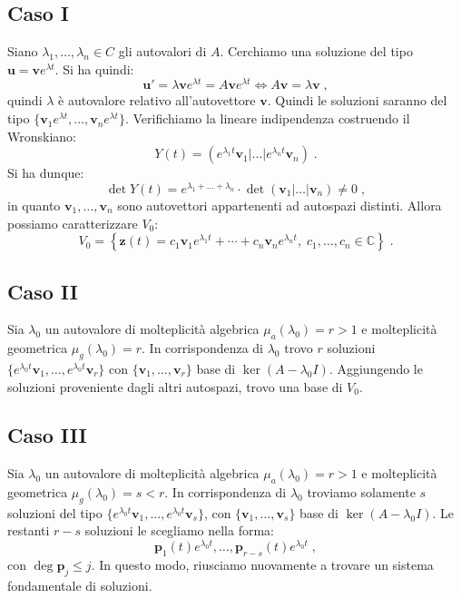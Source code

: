 \documentclass[a4paper,12pt]{report}
\theoremstyle{plain}
\theoremstyle{definition}
\theoremstyle{remark}
\numberwithin{equation}{section}
\begin{document}
\subsection{Caso I}
Siano $\lambda_1,\ldots,\lambda_n \in C$ gli autovalori di $A$. Cerchiamo una soluzione del tipo $\mathbf{u}=\mathbf{v}e^{\lambda t}$. Si ha 
quindi:
\begin{equation}
\mathbf{u}'=\lambda \mathbf{v} e^{\lambda t}= A \mathbf{v} e^{\lambda t} \Longleftrightarrow A\mathbf{v}=\lambda \mathbf{v}\;,
\end{equation}
quindi $\lambda$ è autovalore relativo all'autovettore $\mathbf{v}$. Quindi le soluzioni saranno del tipo $\{\mathbf{v}_1e^{\lambda t},
\ldots,\mathbf{v}_ne^{\lambda t}\}$. Verifichiamo la lineare indipendenza costruendo il Wronskiano:
\begin{equation}
Y(t)=(e^{\lambda_1 t}\mathbf{v}_1|\ldots|e^{\lambda_n t}\mathbf{v}_n)\;.
\end{equation}
Si ha dunque:
\begin{equation}
\det Y(t)=e^{\lambda_1+\ldots+\lambda_n}\cdot \det (\mathbf{v}_1|\ldots|\mathbf{v}_n) \ne 0\;,
\end{equation}
in quanto $\mathbf{v}_1,\ldots,\mathbf{v}_n$ sono autovettori appartenenti ad autospazi distinti. Allora possiamo caratterizzare $V_0$:
\begin{equation}
V_0=\left\{ \mathbf{z}(t)=c_1\mathbf{v}_1e^{\lambda_1 t}+\cdots+c_n\mathbf{v}_ne^{\lambda_n t},\;c_1,\ldots,c_n \in \mathbb{C}\right\}\;.
\end{equation}
\subsection{Caso II}
Sia $\lambda_0$ un autovalore di molteplicità algebrica $\mu_a (\lambda_0)=r>1$ e molteplicità geometrica $\mu_g (\lambda_0)=r$. In 
corrispondenza di $\lambda_0$ trovo $r$ soluzioni $\{e^{\lambda_0 t}\mathbf{v}_1,\ldots,e^{\lambda_0 t}\mathbf{v}_r\}$ con 
$\{\mathbf{v}_1,\ldots,\mathbf{v}_r\}$ base di $\ker(A-\lambda_0 I)$. Aggiungendo le soluzioni proveniente dagli altri autospazi, trovo 
una base di $V_0$.
\subsection{Caso III}
Sia $\lambda_0$ un autovalore di molteplicità algebrica $\mu_a (\lambda_0)=r>1$ e molteplicità geometrica $\mu_g (\lambda_0)=s<r$. In 
corrispondenza di $\lambda_0$ troviamo solamente $s$ soluzioni del tipo $\{e^{\lambda_0 t}\mathbf{v}_1,\ldots,e^{\lambda_0 t}\mathbf{v}_s\}$, con $\{\mathbf{v}_1,\ldots,\mathbf{v}_s\}$ base di $\ker(A-\lambda_0 I)$. Le restanti $r-s$ soluzioni le scegliamo nella forma:
\begin{equation}
\mathbf{p}_1(t)e^{\lambda_0 t},\ldots,\mathbf{p}_{r-s}(t)e^{\lambda_0 t}\;,
\end{equation}
con $\deg \mathbf{p}_j \le j$. In questo modo, riusciamo nuovamente a trovare un sistema fondamentale di soluzioni.
\end{document}
